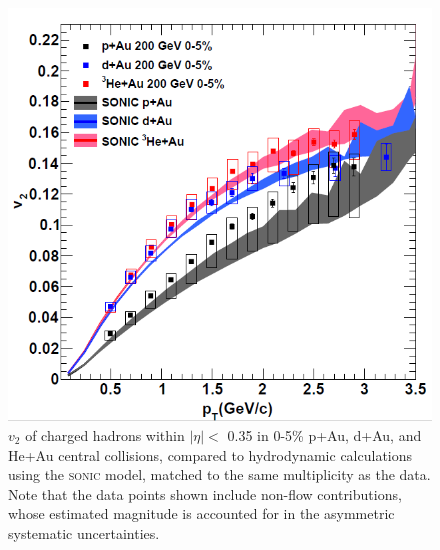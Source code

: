 \begin{figure}[!ht]
\begin{center}
\includegraphics[width=0.65\linewidth]{figs/three_system_comparison_result.png}
\caption{$v_2$ of charged hadrons within $|\eta| <$ 0.35 in 0-5\% p+Au, d+Au, and He+Au central collisions, compared to hydrodynamic calculations using the \textsc{sonic} model, matched to the same multiplicity as the data. Note that the data points shown include non-flow contributions, whose estimated magnitude is accounted for in the asymmetric systematic uncertainties.}
\label{fig:all_system_hydro}
\end{center}
\end{figure}

